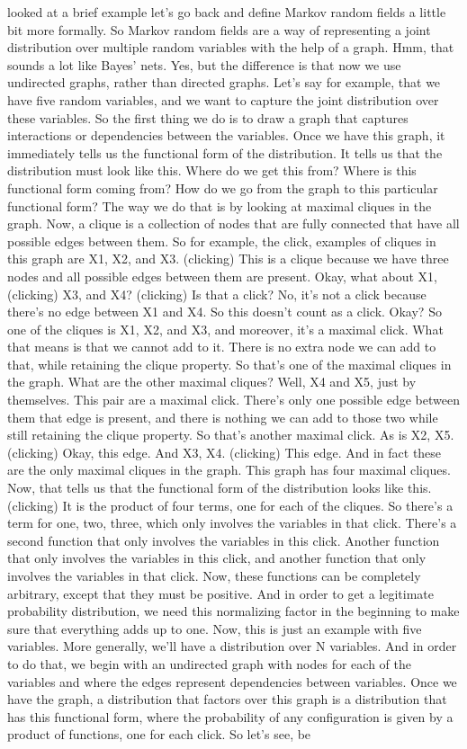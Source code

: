 \documentclass{article}
\begin{document}
\begin{flushleft}
looked at a brief example let's go back and define Markov random fields a little bit more formally. So Markov random fields are a way of representing a joint distribution over multiple random variables with the help of a graph. Hmm, that sounds a lot like Bayes' nets. Yes, but the difference is that now we use undirected graphs, rather than directed graphs. Let's say for example, that we have five random variables, and we want to capture the joint distribution over these variables. So the first thing we do is to draw a graph that captures interactions or dependencies between the variables. Once we have this graph, it immediately tells us the functional form of the distribution. It tells us that the distribution must look like this. Where do we get this from? Where is this functional form coming from? How do we go from the graph to this particular functional form? The way we do that is by looking at maximal cliques in the graph. Now, a clique is a collection of nodes that are fully connected that have all possible edges between them. So for example, the click, examples of cliques in this graph are X1, X2, and X3. (clicking) This is a clique because we have three nodes and all possible edges between them are present. Okay, what about X1, (clicking) X3, and X4? (clicking) Is that a click? No, it's not a click because there's no edge between X1 and X4. So this doesn't count as a click. Okay? So one of the cliques is X1, X2, and X3, and moreover, it's a maximal click. What that means is that we cannot add to it. There is no extra node we can add to that, while retaining the clique property. So that's one of the maximal cliques in the graph. What are the other maximal cliques? Well, X4 and X5, just by themselves. This pair are a maximal click. There's only one possible edge between them that edge is present, and there is nothing we can add to those two while still retaining the clique property. So that's another maximal click. As is X2, X5. (clicking) Okay, this edge. And X3, X4. (clicking) This edge. And in fact these are the only maximal cliques in the graph. This graph has four maximal cliques. Now, that tells us that the functional form of the distribution looks like this. (clicking) It is the product of four terms, one for each of the cliques. So there's a term for one, two, three, which only involves the variables in that click. There's a second function that only involves the variables in this click. Another function that only involves the variables in this click, and another function that only involves the variables in that click. Now, these functions can be completely arbitrary, except that they must be positive. And in order to get a legitimate probability distribution, we need this normalizing factor in the beginning to make sure that everything adds up to one. Now, this is just an example with five variables. More generally, we'll have a distribution over N variables. And in order to do that, we begin with an undirected graph with nodes for each of the variables and where the edges represent dependencies between variables. Once we have the graph, a distribution that factors over this graph is a distribution that has this functional form, where the probability of any configuration is given by a product of functions, one for each click. So let's see, be 
\end{flushleft}
\end{document}
